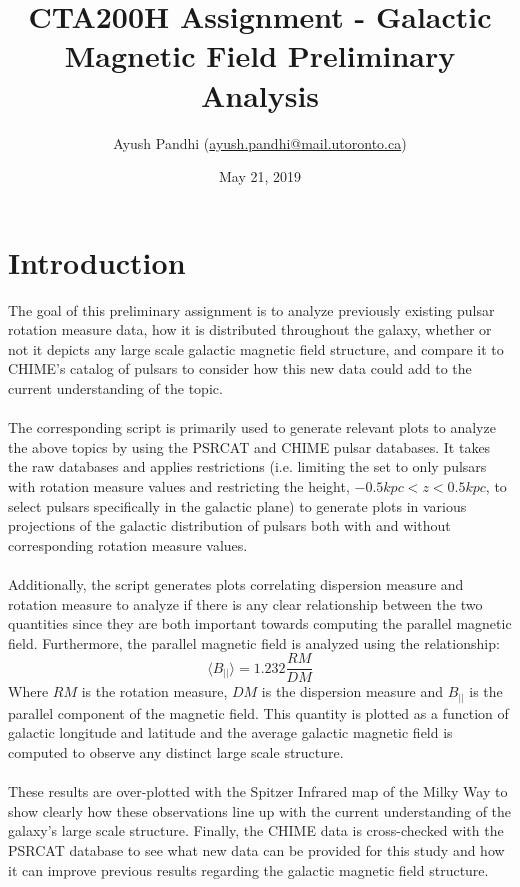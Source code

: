 \documentclass[12pt]{article}
\begin{document}
\title{CTA200H Assignment - Galactic Magnetic Field Preliminary Analysis}
\author{Ayush Pandhi (\href{mailto:ayush.pandhi@mail.utoronto.ca}{ayush.pandhi@mail.utoronto.ca})}
\date{May 21, 2019}
\maketitle

\section{Introduction}
    The goal of this preliminary assignment is to analyze previously existing pulsar rotation measure data, how it is distributed throughout the galaxy, whether or not it depicts any large scale galactic magnetic field structure, and compare it to CHIME's catalog of pulsars to consider how this new data could add to the current understanding of the topic. 
    \\
    \\
    The corresponding script is primarily used to generate relevant plots to analyze the above topics by using the PSRCAT and CHIME pulsar databases. It takes the raw databases and applies restrictions (i.e. limiting the set to only pulsars with rotation measure values and restricting the height, $-0.5 kpc < z < 0.5 kpc$, to select pulsars specifically in the galactic plane) to generate plots in various projections of the galactic distribution of pulsars both with and without corresponding rotation measure values.
    \\
    \\
    Additionally, the script generates plots correlating dispersion measure and rotation measure to analyze if there is any clear relationship between the two quantities since they are both important towards computing the parallel magnetic field. Furthermore, the parallel magnetic field is analyzed using the relationship:
    \begin{equation}
        \langle B_{||} \rangle = 1.232 \frac{RM}{DM} \label{eq:1}
    \end{equation}
    Where $RM$ is the rotation measure, $DM$ is the dispersion measure and $B_{||}$ is the parallel component of the magnetic field. This quantity is plotted as a function of galactic longitude and latitude and the average galactic magnetic field is computed to observe any distinct large scale structure.
    \\
    \\
    These results are over-plotted with the Spitzer Infrared map of the Milky Way to show clearly how these observations line up with the current understanding of the galaxy's large scale structure. Finally, the CHIME data is cross-checked with the PSRCAT database to see what new data can be provided for this study and how it can improve previous results regarding the galactic magnetic field structure.
\end{document}
